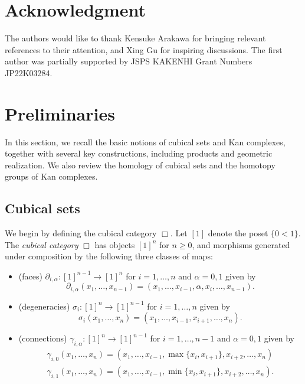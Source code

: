 \documentclass[oneside, 12pt]{amsart}
\numberwithin{equation}{section}
\theoremstyle{plain}
\theoremstyle{definition}
\theoremstyle{remark}
\begin{document}
	\section*{Acknowledgment}
	The authors would like to thank Kensuke Arakawa for bringing relevant references to their attention, and Xing Gu for inspiring discussions. The first author was partially supported by JSPS KAKENHI Grant Numbers JP22K03284.
	
	\section{Preliminaries}\label{Preliminaries}
	
	In this section, we recall the basic notions of cubical sets and Kan complexes, together with several key constructions, including products and geometric realization. We also review the homology of cubical sets and the homotopy groups of Kan complexes.
	
	
	
	\subsection{Cubical sets}
	
	We begin by defining the cubical category $\Box$. Let $[1]$ denote the poset $\{0<1\}$. The \emph{cubical category} $\Box$ has objects $[1]^n$ for $n\ge 0$, and morphisms generated under composition by the following three classes of maps:
	
	\begin{itemize}
		\item (faces) $\partial_{i,\alpha}\colon[1]^{n-1}\to[1]^n$ for $i=1,\ldots,n$ and $\alpha=0,1$ given by
		\[
		\partial_{i,\alpha}(x_1,\ldots,x_{n-1})=(x_1,\ldots,x_{i-1},\alpha,x_i,\ldots,x_{n-1}).
		\]
		
		\item (degeneracies) $\sigma_i\colon[1]^n\to[1]^{n-1}$ for $i=1,\ldots,n$ given by
		\[
		\sigma_i(x_1,\ldots,x_n)=(x_1,\ldots,x_{i-1},x_{i+1},\ldots,x_n).
		\]
		
		\item (connections) $\gamma_{i,\alpha}\colon[1]^{n}\to[1]^{n-1}$ for $i=1,\ldots,n-1$ and $\alpha=0,1$ given by
		\begin{align*}
			\gamma_{i,0}(x_1,\ldots,x_{n})=(x_1,\ldots,x_{i-1},\max\{x_i,x_{i+1}\},x_{i+2},\ldots,x_n)\\
			\gamma_{i,1}(x_1,\ldots,x_{n})=(x_1,\ldots,x_{i-1},\min\{x_i,x_{i+1}\},x_{i+2},\ldots,x_n).
		\end{align*}
	\end{itemize}
	
\end{document}
